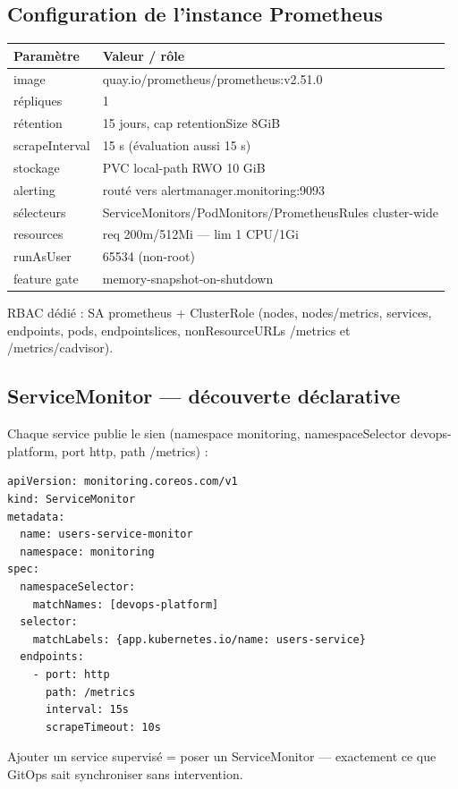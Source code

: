 \documentclass[12pt,a4paper]{article}
\begin{document}
\subsection{Configuration de l'instance Prometheus}
\begin{longtable}{@{}p{4.6cm}p{9.6cm}@{}}
\toprule
\textbf{Paramètre} & \textbf{Valeur / rôle} \\
\midrule
\endhead
image & quay.io/prometheus/prometheus:v2.51.0 \\
répliques & 1 \\
rétention & 15 jours, cap retentionSize 8GiB \\
scrapeInterval & 15 s (évaluation aussi 15 s) \\
stockage & PVC local-path RWO 10 GiB \\
alerting & routé vers alertmanager.monitoring:9093 \\
sélecteurs & ServiceMonitors/PodMonitors/PrometheusRules cluster-wide \\
resources & req 200m/512Mi --- lim 1 CPU/1Gi \\
runAsUser & 65534 (non-root) \\
feature gate & memory-snapshot-on-shutdown \\
\bottomrule
\end{longtable}

RBAC dédié : SA prometheus + ClusterRole (nodes, nodes/metrics, services, endpoints, pods, endpointslices, nonResourceURLs /metrics et /metrics/cadvisor).

\subsection{ServiceMonitor --- découverte déclarative}
Chaque service publie le sien (namespace monitoring, namespaceSelector devops-platform, port http, path /metrics) :
\begin{lstlisting}[caption={ServiceMonitor --- intervalle 15 s aligné sur Prometheus}]
apiVersion: monitoring.coreos.com/v1
kind: ServiceMonitor
metadata:
  name: users-service-monitor
  namespace: monitoring
spec:
  namespaceSelector:
    matchNames: [devops-platform]
  selector:
    matchLabels: {app.kubernetes.io/name: users-service}
  endpoints:
    - port: http
      path: /metrics
      interval: 15s
      scrapeTimeout: 10s
\end{lstlisting}

Ajouter un service supervisé = poser un ServiceMonitor --- exactement ce que GitOps sait synchroniser sans intervention.
\end{document}
